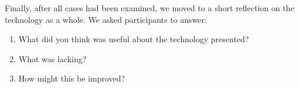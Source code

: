Finally, after all cases had been examined, we moved to a short reflection on the technology as a whole. We asked participants to answer:

\begin{enumerate}
    \item What did you think was useful about the technology presented?
    \item What was lacking?
    \item How might this be improved?
\end{enumerate}
